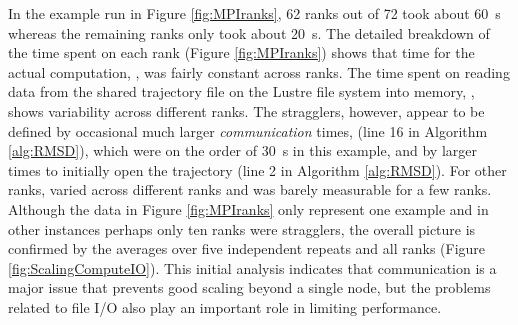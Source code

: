In the example run in Figure \ref{fig:MPIranks}, 62 ranks out of 72 took about 60~s whereas the remaining ranks only took about 20~s. 
The detailed breakdown of the time spent on each rank (Figure \ref{fig:MPIranks}) shows that time
for the actual computation, \tcomp, was fairly constant across ranks. 
The time spent on reading data from the shared trajectory file on the Lustre file system into memory, \tIO, shows variability across different ranks. 
The stragglers, however, appear to be defined by occasional much larger \emph{communication} times, \tcomm (line 16 in Algorithm \ref{alg:RMSD}), which were on the order of 30~s in this example, and by larger times to initially open the trajectory (line 2 in Algorithm \ref{alg:RMSD}).
For other ranks, \tcomm varied across different ranks and was barely measurable for a few ranks.
Although the data in Figure \ref{fig:MPIranks} only represent one example and in other instances perhaps only ten ranks were stragglers, the overall picture is confirmed by the averages over five independent repeats and all ranks (Figure \ref{fig:ScalingComputeIO}).
This initial analysis indicates that communication is a major issue that prevents good scaling beyond a single node, but the problems related to file I/O also play an important role in limiting performance.



